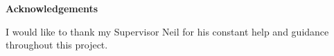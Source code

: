 \thispagestyle{empty}

\begin{center}
    {\LARGE\bf Acknowledgements}
\end{center}

I would like to thank my Supervisor Neil for his constant help and guidance throughout this project.

